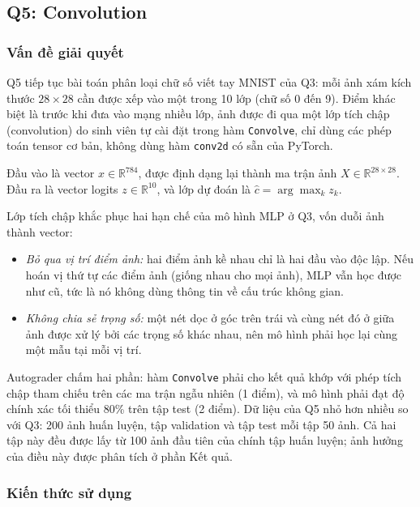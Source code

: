 \subsection{Q5: Convolution}

\subsubsection{Vấn đề giải quyết}
Q5 tiếp tục bài toán phân loại chữ số viết tay MNIST của Q3: mỗi ảnh xám
kích thước $28 \times 28$ cần được xếp vào một trong 10 lớp (chữ số 0 đến
9). Điểm khác biệt là trước khi đưa vào mạng nhiều lớp, ảnh được đi qua một
lớp tích chập (convolution) do sinh viên tự cài đặt trong hàm
\texttt{Convolve}, chỉ dùng các phép toán tensor cơ bản, không dùng hàm
\texttt{conv2d} có sẵn của PyTorch.

Đầu vào là vector $x \in \mathbb{R}^{784}$, được định dạng lại thành ma trận
ảnh $X \in \mathbb{R}^{28 \times 28}$. Đầu ra là vector logits
$z \in \mathbb{R}^{10}$, và lớp dự đoán là $\hat{c} = \arg\max_k z_k$.

Lớp tích chập khắc phục hai hạn chế của mô hình MLP ở Q3, vốn duỗi ảnh
thành vector:
\begin{itemize}
  \item \emph{Bỏ qua vị trí điểm ảnh:} hai điểm ảnh kề nhau chỉ là hai đầu
  vào độc lập. Nếu hoán vị thứ tự các điểm ảnh (giống nhau cho mọi ảnh), MLP
  vẫn học được như cũ, tức là nó không dùng thông tin về cấu trúc không gian.
  \item \emph{Không chia sẻ trọng số:} một nét dọc ở góc trên trái và cùng
  nét đó ở giữa ảnh được xử lý bởi các trọng số khác nhau, nên mô hình phải
  học lại cùng một mẫu tại mỗi vị trí.
\end{itemize}

Autograder chấm hai phần: hàm \texttt{Convolve} phải cho kết quả khớp với
phép tích chập tham chiếu trên các ma trận ngẫu nhiên (1 điểm), và mô hình
phải đạt độ chính xác tối thiểu 80\% trên tập test (2 điểm). Dữ liệu của Q5
nhỏ hơn nhiều so với Q3: 200 ảnh huấn luyện, tập validation và tập test mỗi
tập 50 ảnh. Cả hai tập này đều được lấy từ 100 ảnh đầu tiên của chính tập
huấn luyện; ảnh hưởng của điều này được phân tích ở phần Kết quả.

\subsubsection{Kiến thức sử dụng}


